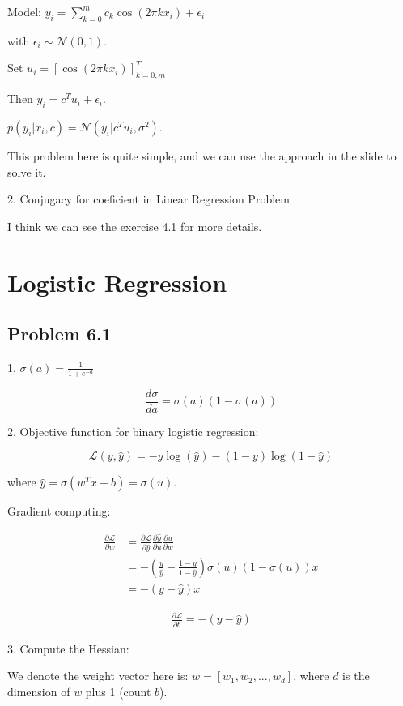 \documentclass{article}
\begin{document}
Model: $y_i=\sum_{k=0}^mc_k\cos(2\pi kx_i)+\epsilon_i$

with $\epsilon_i\sim \mathcal{N}(0,1)$.

Set $u_i=[\cos(2\pi kx_i)]^T_{k=\overline{0,m}}$

Then $y_i=c^Tu_i+\epsilon_i$.

$p(y_i|x_i,c) = \mathcal{N}(y_i|c^Tu_i,\sigma^2)$.

This problem here is quite simple, and we can use the approach in the slide to solve it.

2. Conjugacy for coeficient in Linear Regression Problem

I think we can see the exercise 4.1 for more details.

\section{Logistic Regression}

\subsection{Problem 6.1}

1. $\sigma(a)=\frac{1}{1+e^{-a}}$

$$
\frac{d\sigma}{da}=\sigma(a)(1-\sigma(a))
$$

2. Objective function for binary logistic regression:

$$
\mathcal{L}(y,\hat{y}) = -y\log(\hat{y})-(1-y)\log(1-\hat{y})
$$

where $\hat{y}=\sigma(w^Tx+b)=\sigma(u)$.

Gradient computing:

$$
\begin{aligned}
    \frac{\partial \mathcal{L}}{\partial w}&=\frac{\partial \mathcal{L}}{\partial \hat{y}}\frac{\partial \hat{y}}{\partial u}\frac{\partial u}{\partial w}\\
    &=-(\frac{y}{\hat{y}}-\frac{1-y}{1-\hat{y}})\sigma(u)(1-\sigma(u))x\\
    &=-(y-\hat{y})x
\end{aligned}
$$

$$
\begin{aligned}
    \frac{\partial \mathcal{L}}{\partial b}=-(y-\hat{y})
\end{aligned}
$$

3. Compute the Hessian:

We denote the weight vector here is: $w=[w_1,w_2,...,w_d]$, where $d$ is the dimension of $w$ plus 1 (count $b$).
\end{document}
